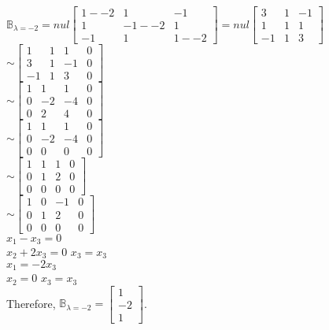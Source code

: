 \documentclass{report}
\begin{document}
\begin{center}
    $\mathbb{B}_{\lambda=-2}=
    nul\begin{bmatrix}
        1--2 & 1 & -1 \\ 
        1 & -1--2 & 1 \\ 
        -1 & 1 & 1--2
    \end{bmatrix}=
    nul\begin{bmatrix}
        3 & 1 & -1 \\ 
        1 & 1 & 1 \\ 
        -1 & 1 & 3
    \end{bmatrix}$\\\vspace{3mm}
    $\sim \begin{bmatrix}
        1 & 1 & 1 & 0 \\ 
        3 & 1 & -1 & 0 \\
        -1 & 1 & 3 & 0
    \end{bmatrix}$\\\vspace{3mm}
    $\sim \begin{bmatrix}
        1 & 1 & 1 & 0 \\ 
        0 & -2 & -4 & 0 \\
        0 & 2 & 4 & 0
    \end{bmatrix}$\\\vspace{3mm}
    $\sim \begin{bmatrix}
        1 & 1 & 1 & 0 \\ 
        0 & -2 & -4 & 0 \\
        0 & 0 & 0 & 0
    \end{bmatrix}$\\\vspace{3mm}
    $\sim \begin{bmatrix}
        1 & 1 & 1 & 0 \\ 
        0 & 1 & 2 & 0 \\
        0 & 0 & 0 & 0
    \end{bmatrix}$\\\vspace{3mm}
    $\sim \begin{bmatrix}
        1 & 0 & -1 & 0 \\ 
        0 & 1 & 2 & 0 \\
        0 & 0 & 0 & 0
    \end{bmatrix}$\\\vspace{3mm}
    $x_1-x_3=0$\\
    $x_2+2x_3=0$
    $x_3=x_3$\\\vspace{3mm}
    $x_1=-2x_3$\\
    $x_2=0$
    $x_3=x_3$\\\vspace{3mm}
    Therefore, $\mathbb{B}_{\lambda=-2}=\begin{bmatrix}
        1 \\
        -2 \\
        1
    \end{bmatrix}$.\vspace{3mm}
\end{center}
\end{document}
